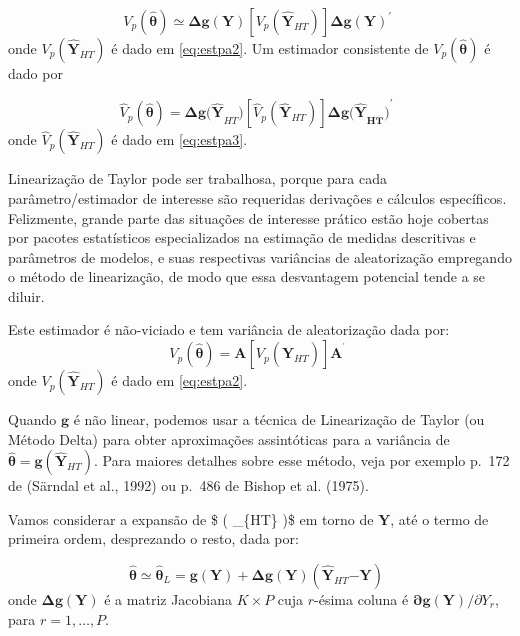 \documentclass[
  12pt,
  brazilian,
]{book}
\theoremstyle{definition}
\theoremstyle{definition}
\theoremstyle{definition}
\theoremstyle{definition}
\theoremstyle{remark}
\begin{document}
\[
V_{p} \left( \mathbf{\widehat{\theta}} \right) \mathbf{\simeq \Delta g(Y)} \left[
V_{p} \left( \mathbf{\hat{Y}}_{HT} \right) \right] \mathbf{\Delta g(Y)}^{\prime}
\,\, \label{eq:estpa20}
\]
onde \(V_{p} \left( \mathbf{\widehat{Y}}_{HT}\right)\) é dado em \eqref{eq:estpa2}. Um estimador consistente de \(V_{p} \left( \mathbf{\widehat{\theta}}\right)\) é dado por

\[
\hat{V}_{p} \left( \mathbf{\widehat{\theta}} \right) = \mathbf{\Delta g( \widehat{Y} }_{HT} \mathbf{)} \left[ \widehat{V}_{p} \left( \mathbf{\widehat{Y}}_{HT} \right) \right] \mathbf{\Delta g\mathbf{(\widehat{Y}}_{HT} \mathbf{)}}^{\prime} \,\,\,  \label{eq:estpa21}
\]
onde \(\widehat{V}_{p}\left( \mathbf{\widehat{Y}}_{HT}\right)\) é dado em \eqref{eq:estpa3}.

Linearização de Taylor pode ser trabalhosa, porque para cada parâmetro/estimador de interesse são requeridas derivações e cálculos específicos. Felizmente, grande parte das situações de interesse prático estão hoje cobertas por pacotes estatísticos especializados na estimação de medidas descritivas e parâmetros de modelos, e suas respectivas variâncias de aleatorização empregando o método de linearização, de modo que essa desvantagem potencial tende a se diluir.

Este estimador é não-viciado e tem variância de aleatorização dada por:
\[
V_{p}\left( \mathbf{\widehat{\theta}} \right) = \mathbf{A} \left[ V_{p} \left( \mathbf{\widehat{Y}}_{HT} \right) \right] \mathbf{A}^{^{\prime }} \,\,
\]
onde \(V_{p} \left( \mathbf{\widehat{Y}}_{HT}\right)\) é dado em \eqref{eq:estpa2}.

Quando \(\mathbf{g}\) é não linear, podemos usar a técnica de Linearização de Taylor (ou Método Delta) para obter aproximações assintóticas para a variância de
\(\mathbf{ \widehat{\theta}} = \mathbf{g} \left( \widehat{\mathbf{Y}}_{HT}\right)\). Para maiores detalhes sobre esse método, veja por exemplo p.~172 de (Särndal et al., 1992) ou p.~486 de Bishop et al. (1975).

Vamos considerar a expansão de \$  \left( \_\{HT\} \right)\$ em torno de \(\mathbf{Y}\), até o termo de primeira ordem, desprezando o resto, dada por:

\[
\mathbf{\widehat{\theta} \simeq \widehat{\theta}}_{L} = \mathbf{g(Y) + \Delta g(Y)} \left( \mathbf{\widehat{Y}}_{HT} \mathbf{-Y} \right) \,\,\, \label{eq:estpa19}
\]
onde \(\mathbf{\Delta g(Y)}\) é a matriz Jacobiana \(K \times P\) cuja \(r\)-ésima coluna é \(\mathbf{\partial g(Y)/}\partial Y_{r}\), para \(r=1,\ldots, P\).
\end{document}
